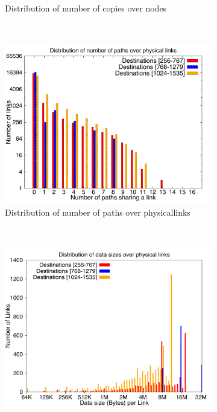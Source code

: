 \begin{figure}[!htbp]
\begin{subfigure}[b]{0.49\textwidth}
                \caption{Distribution of number of copies over nodes}
                \label{fig:incrdist_2k_copy}
        \end{subfigure}
        ~ %
        \begin{subfigure}[b]{0.49\textwidth}
                \includegraphics[width=\textwidth]{report_figures/incrdist/2k/loadpath_histo.pdf}
                \caption{Distribution of number of paths over physicallinks}
                \label{fig:incrdist_2k_loadpath}
        \end{subfigure}
        ~ %
        \begin{subfigure}[b]{0.49\textwidth}
                \includegraphics[width=\textwidth]{report_figures/incrdist/2k/loaddata_histo.pdf}

\end{subfigure}
\end{figure}
